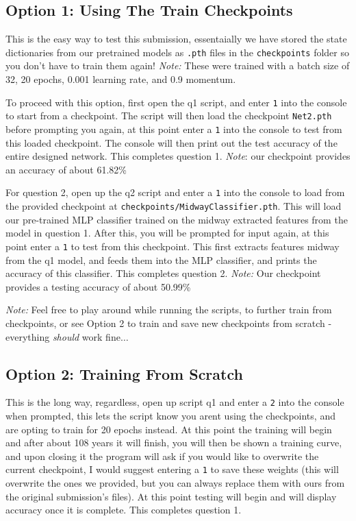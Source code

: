 \documentclass[]{report}
\begin{document}
\subsection*{Option 1: Using The Train Checkpoints}
This is the easy way to test this submission, essentaially we have stored the state dictionaries from our pretrained models as \texttt{.pth} files in the \texttt{checkpoints} folder so you don't have to train them again! \textit{Note:} These were trained with a batch size of 32, 20 epochs, 0.001 learning rate, and 0.9 momentum.

To proceed with this option, first open the q1 script, and enter \texttt{1} into the console to start from a checkpoint. The script will then load the checkpoint \texttt{Net2.pth} before prompting you again, at this point enter a \texttt{1} into the console to test from this loaded checkpoint. The console will then print out the test accuracy of the entire designed network. This completes question 1.
\textit{Note}: our checkpoint provides an accuracy of about 61.82\%

For question 2, open up the q2 script and enter a \texttt{1} into the console to load from the provided checkpoint at \texttt{checkpoints/MidwayClassifier.pth}. This will load our pre-trained MLP classifier trained on the midway extracted features from the model in question 1. After this, you will be prompted for input again, at this point enter a \texttt{1} to test from this checkpoint. This first extracts features midway from the q1 model, and feeds them into the MLP classifier, and prints the accuracy of this classifier.
This completes question 2. \textit{Note:} Our checkpoint provides a testing accuracy of about 50.99\%

\textit{Note:} Feel free to play around while running the scripts, to further train from checkpoints, or see Option 2 to train and save new checkpoints from scratch - everything \textit{should} work fine$\ldots$

\subsection*{Option 2: Training From Scratch}
This is the long way, regardless, open up script q1 and enter a \texttt{2} into the console when prompted, this lets the script know you arent using the checkpoints, and are opting to train for 20 epochs instead. At this point the training will begin and after about 108 years it will finish, you will then be shown a training curve, and upon closing it the program will ask if you would like to overwrite the current checkpoint, I would suggest entering a \texttt{1} to save these weights (this will overwrite the ones we provided, but you can always replace them with ours from the original submission's files). At this point testing will begin and will display accuracy once it is complete. This completes question 1.
\end{document}
